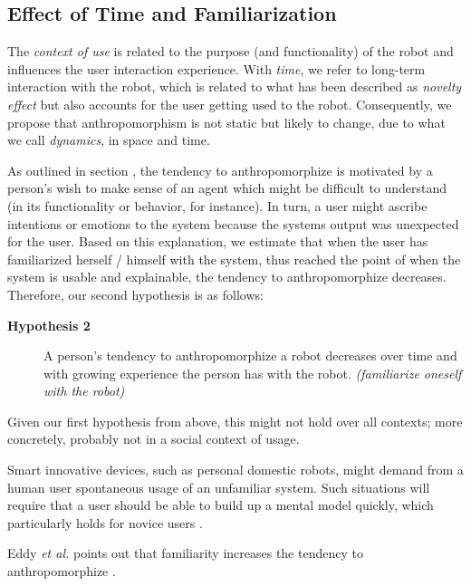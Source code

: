 \documentclass{acm_proc_article-sp}
\begin{document}
\subsection{Effect of Time and Familiarization}
\label{sec:8.2}

The \textit{context of use} is related to the purpose (and functionality) of
the robot and influences the user interaction experience. With \textit{time},
we refer to long-term interaction with the robot, which is related to what has
been described as \textit{novelty effect} but also accounts for the user
getting used to the robot. Consequently, we propose that anthropomorphism is
not static but likely to change, due to what we call \textit{dynamics}, in
space and time.


As outlined in section , the tendency to anthropomorphize is
motivated by a person's wish to make sense of an agent which might be difficult
to understand (in its functionality or behavior, for instance). In turn, a user
might ascribe intentions or emotions to the system because the systems output
was unexpected for the user. Based on this explanation, we estimate that when
the user has familiarized herself / himself with the system, thus reached the
point of when the system is usable and explainable, the tendency to
anthropomorphize decreases. Therefore, our second hypothesis is as follows: 

\begin{description}

    \item[\textbf{Hypothesis 2}] A person's tendency to anthropomorphize a
        robot decreases over time and with growing experience the person has
        with the robot. \textit{(familiarize oneself with the robot)}

\end{description}	
	

Given our first hypothesis from above, this might not hold over all contexts;
more concretely, probably not in a social context of usage.


Smart innovative devices, such as personal domestic robots, might demand from a
human user spontaneous usage of an unfamiliar system. Such situations will
require that a user should be able to build up a mental model quickly, which
particularly holds for novice users \cite{schmitz_concepts_2011}.

Eddy \textit{et al.} points out that familiarity increases the tendency to
anthropomorphize \cite{eddy_attribution_1993}.
\end{document}
